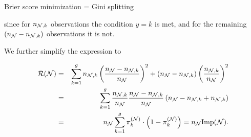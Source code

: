 \documentclass[11pt,compress,t,notes=noshow, xcolor=table]{beamer}
\begin{document}
\begin{vbframe}{Brier score minimization = Gini splitting}
\begin{footnotesize}
since for $n_{\mathcal{N},k}$ observations the condition $y = k$ is met, and for the remaining $(n_{\mathcal{N}} - n_{\mathcal{N},k})$ observations it is not. 


We further simplify the expression to

\begin{eqnarray*}
\mathcal{R}(\mathcal{N}) &=&  \sum_{k = 1}^g n_{\mathcal{N},k}\left(\frac{n_{\mathcal{N} } - n_{\mathcal{N},k}}{n_{\mathcal{N} }}\right)^2 + (n_{\mathcal{N} } - n_{\mathcal{N},k})\left(\frac{n_{\mathcal{N},k}}{n_{\mathcal{N} }}\right)^2 \\
&=& \sum_{k = 1}^g \frac{n_{\mathcal{N},k}}{n_{\mathcal{N} }} \frac{n_{\mathcal{N} } - n_{\mathcal{N},k}}{n_{\mathcal{N} }} \left(n_{\mathcal{N} } - n_{\mathcal{N},k } + n_{\mathcal{N},k}\right) \\
&=& n_{\mathcal{N} } \sum_{k = 1}^g \pi_k^{(\mathcal{N})} \cdot \left(1 - \pi_k^{(\mathcal{N})} \right) = n_{\mathcal{N}} \text{Imp}(\mathcal{N}).
\end{eqnarray*}

\end{footnotesize}

\end{vbframe}


\endlecture
\end{document}
